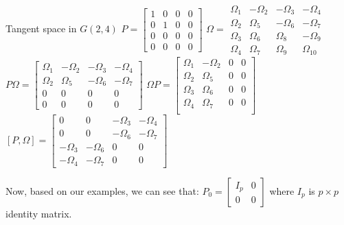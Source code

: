 \documentclass[11pt,a4paper]{report}
\begin{document}
\begin{Ex}{Tangent space in $G(2,4)$}
    $P = \begin{bmatrix} 1 & 0 & 0 & 0 \\ 0 & 1 & 0 & 0 \\ 0 & 0 & 0 & 0 \\ 0 & 0 & 0 & 0 \end{bmatrix}$
    $\Omega = \begin{matrix} \Omega_1 & -\Omega_2 & -\Omega_3 & - \Omega_4 \\
                              \Omega_2 & \Omega_5 & - \Omega_6 & -\Omega_7 \\ 
                              \Omega_3 & \Omega_6 & \Omega_8 & - \Omega_9 \\ 
                              \Omega_4 & \Omega_7 & \Omega_9 & \Omega_{10} 
                            \end{matrix}  $
    $P \Omega = \begin{bmatrix} \Omega_1 & -\Omega_2 & -\Omega_3 & -\Omega_4 \\
                            \Omega_2 & \Omega_5 & -\Omega_6 & -\Omega_7 \\
                            0 & 0 & 0 & 0 \\
                            0 & 0 & 0 & 0
                         \end{bmatrix} $
    $ \Omega P = \begin{bmatrix}
                \Omega_1 & -\Omega_2 & 0 & 0 \\
                \Omega_2 & \Omega_5 & 0 & 0 \\
                \Omega_3 & \Omega_6 & 0 & 0 \\
                \Omega_4 & \Omega_7 & 0 & 0 \\
                \end{bmatrix}$
    $ [P,\Omega] = \begin{bmatrix}
                0 & 0 & - \Omega_3 & -\Omega_4 \\
                0 & 0 & - \Omega_6 & - \Omega_7 \\
                - \Omega_3 & - \Omega_6 & 0 & 0 \\
                - \Omega_4 & - \Omega_7  & 0 & 0
    \end{bmatrix}
    $
\end{Ex}
Now, based on our examples, we can see that:
$ P_0 = \begin{bmatrix} I_p & 0 \\ 0 & 0 \end{bmatrix}$ where $I_p$ is $p \times p$ identity matrix.
\end{document}
